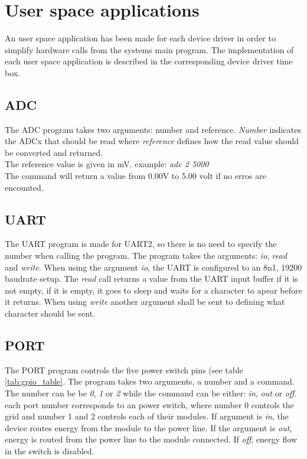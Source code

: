 \section{User space applications}
An user space application has been made for each device driver in order to simplify hardware calls from the systems main program. The implementation of each user space application is described in the corresponding device driver time box. 
\subsection{ADC}
The ADC program takes two arguments: number and reference. \textit{Number} indicates the ADCx that should be read where \textit{reference} defines how the read value should be converted and returned. 
\\The reference value is given in mV.
\p example: \textit{adc 2 5000}
\\The command will return a value from 0.00V to 5.00 volt if no erros are encounted. 
\subsection{UART}
The UART program is made for UART2, so there is no need to specify the number when calling the program. The program takes the arguments: \textit{io}, \textit{read} and \textit{write}. When using the argument \textit{io}, the UART is configured to an 8n1, 19200 baudrate setup. The \textit{read} call returns a value from the UART input buffer if it is not empty, if it is empty, it goes to sleep and waits for a character to apear before it returns. When using \textit{write} another argument shall be sent to defining what character should be sent.
\subsection{PORT}
The PORT program controls the five power switch pins (see table \ref{tab:gpio_table}. The program takes two arguments, a number and a command. The number can be be \textit{0}, \textit{1} or \textit{2} while the command can be either: \textit{in}, \textit{out} or \textit{off}.
\p each port number corresponds to an power switch, where number 0 controls the grid and number 1 and 2 controls each of their modules. 
\p If argument is \textit{in}, the device routes energy from the module to the power line. If the argument is \textit{out}, energy is routed from the power line to the module connected. If \textit{off}, energy flow in the switch is disabled.
